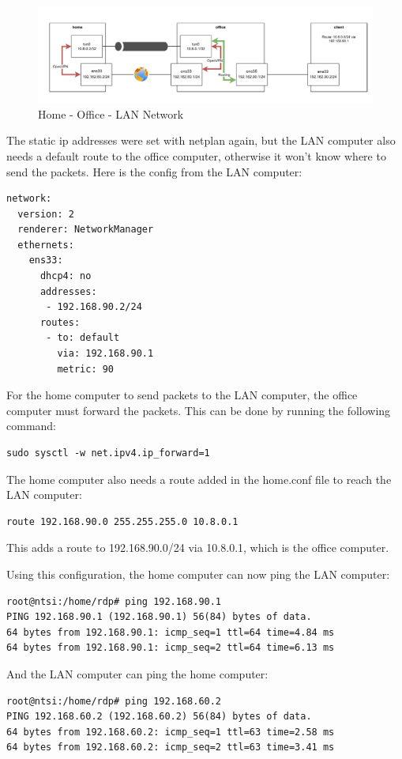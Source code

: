 
\begin{figure}[H]
	\centering
	\includegraphics[width=1\linewidth]{Figures/home-office-lan.png}
	\caption{Home - Office - LAN Network}
\end{figure}

The static ip addresses were set with netplan again, but the LAN computer also needs a default route to the office computer, otherwise it won't know where to send the packets. Here is the config from the LAN computer:

\begin{verbatim}
network:
  version: 2
  renderer: NetworkManager
  ethernets:
    ens33:
      dhcp4: no
      addresses:
       - 192.168.90.2/24
      routes:
       - to: default
         via: 192.168.90.1
         metric: 90
\end{verbatim}

For the home computer to send packets to the LAN computer, the office computer must forward the packets. This can be done by running the following command:

\begin{verbatim}
sudo sysctl -w net.ipv4.ip_forward=1
\end{verbatim}

The home computer also needs a route added in the home.conf file to reach the LAN computer:

\begin{verbatim}
route 192.168.90.0 255.255.255.0 10.8.0.1
\end{verbatim}

This adds a route to 192.168.90.0/24 via 10.8.0.1, which is the office computer.

Using this configuration, the home computer can now ping the LAN computer:

\begin{verbatim}
root@ntsi:/home/rdp# ping 192.168.90.1
PING 192.168.90.1 (192.168.90.1) 56(84) bytes of data.
64 bytes from 192.168.90.1: icmp_seq=1 ttl=64 time=4.84 ms
64 bytes from 192.168.90.1: icmp_seq=2 ttl=64 time=6.13 ms
\end{verbatim}

And the LAN computer can ping the home computer:

\begin{verbatim}
root@ntsi:/home/rdp# ping 192.168.60.2
PING 192.168.60.2 (192.168.60.2) 56(84) bytes of data.
64 bytes from 192.168.60.2: icmp_seq=1 ttl=63 time=2.58 ms
64 bytes from 192.168.60.2: icmp_seq=2 ttl=63 time=3.41 ms
\end{verbatim}